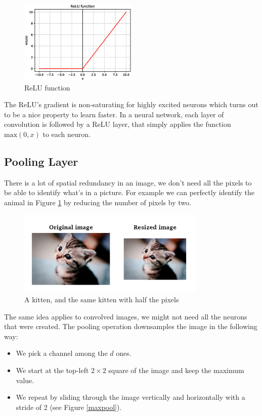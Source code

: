\begin{figure}[H]
\centering
\includegraphics[width=0.5\textwidth]{Images/relu.eps}
\caption{ReLU function}
\end{figure}

The ReLU's gradient is non-saturating for highly excited neurons which turns out to be a nice property to learn faster. In a neural network, each layer of convolution is followed by a ReLU layer, that simply applies the function $\text{max}(0,x)$ to each neuron.

\newpage
\subsection{Pooling Layer}
There is a lot of spatial redundancy in an image, we don't need all the pixels to be able to identify what's in a picture. For example we can perfectly identify the animal in Figure \ref{kittens} by reducing the number of pixels by two.

\begin{figure}[H]
\centering
\includegraphics[width=0.8\textwidth]{Images/kittens.png}
\caption{A kitten, and the same kitten with half the pixels}
\label{kittens}
\end{figure}

The same idea applies to convolved images, we might not need all the neurons that were created. The pooling operation downsamples the image in the following way:
\begin{itemize}
    \item We pick a channel among the $d$ ones.
    \item We start at the top-left $2\times 2$ square of the image and keep the maximum value.
    \item We repeat by sliding through the image vertically and horizontally with a stride of 2 (see Figure \ref{maxpool}).
\end{itemize}

